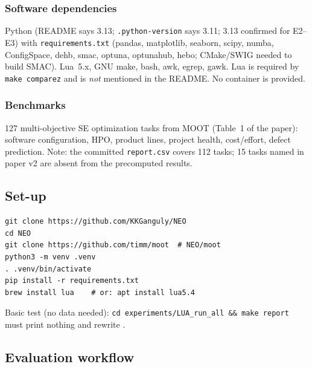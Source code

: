 \subsubsection{Software dependencies}
Python (README says 3.13; \texttt{.python-version} says 3.11; 3.13
confirmed for E2--E3) with \texttt{requirements.txt} (pandas,
matplotlib, seaborn, scipy, numba, ConfigSpace, dehb, smac, optuna,
optunahub, hebo; CMake/SWIG needed to build SMAC). Lua~5.x, GNU make,
bash, awk, egrep, gawk. Lua is required by \texttt{make comparez}
and is \emph{not} mentioned in the README. No container is provided.

\subsubsection{Benchmarks}
127 multi-objective SE optimization tasks from MOOT (Table~1 of the
paper): software configuration, HPO, product lines, project health,
cost/effort, defect prediction. Note: the committed
\texttt{report.csv} covers 112 tasks; 15 tasks named in paper v2 are
absent from the precomputed results.

\subsection{Set-up}
{\footnotesize\begin{verbatim}
git clone https://github.com/KKGanguly/NEO
cd NEO
git clone https://github.com/timm/moot  # NEO/moot
python3 -m venv .venv
. .venv/bin/activate
pip install -r requirements.txt
brew install lua    # or: apt install lua5.4
\end{verbatim}}
Basic test (no data needed): \texttt{cd experiments/LUA\_run\_all
\&\& make report} must print nothing and rewrite
.

\subsection{Evaluation workflow}

